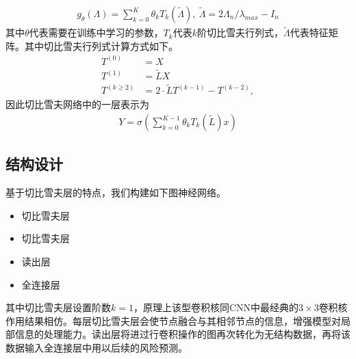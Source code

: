 \begin{equation}\begin{aligned}
g_{\theta}(\Lambda)=\sum_{k=0}^{K}\theta_kT_k(\tilde{\Lambda}),\ \tilde{\Lambda}=2\Lambda_n/\lambda_{max}-I_n
\end{aligned}\end{equation}
其中$\theta$代表需要在训练中学习的参数，$T_k$代表$k$阶切比雪夫行列式，$\tilde{\Lambda}$代表特征矩阵。其中切比雪夫行列式计算方式如下。
\begin{equation}\begin{aligned}
T^{(0)} &= X \\
T^{(1)} &= \tilde L X \\
T^{(k \ge 2)} &= 2 \cdot \tilde L T^{(k - 1)} - T^{(k - 2)},
\end{aligned}\end{equation}
因此切比雪夫网络中的一层表示为
\begin{equation}\begin{aligned}
Y=\sigma \left(  \sum_{k=0}^{K-1}{\theta_k T_k (\tilde{L})}   x \right) 
\end{aligned}\end{equation}
\subsection{结构设计}

基于切比雪夫层的特点，我们构建如下图神经网络。

\begin{itemize}
\item
  切比雪夫层
\item
  切比雪夫层
\item
  读出层
\item
  全连接层
\end{itemize}

其中切比雪夫层设置阶数$k=1$，原理上该型卷积核同CNN中最经典的$3\times3$卷积核作用结果相仿。每层切比雪夫层会使节点融合与其相邻节点的信息，增强模型对局部信息的处理能力。读出层将进过行卷积操作的图再次转化为无结构数据，再将该数据输入全连接层中用以后续的风险预测。
